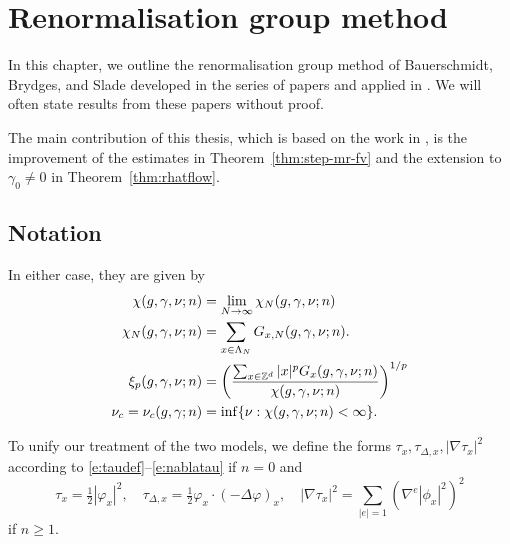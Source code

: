 \chapter{Renormalisation group method}
\label{sec:rg}

\renewcommand{\pm}{+}					%

In this chapter, we outline the renormalisation group method of Bauerschmidt,
Brydges, and Slade developed in the series of papers
\cite{BS-rg-norm,BS-rg-loc,BBS-rg-pt,BS-rg-IE,BS-rg-step} and
applied in \cite{BBS-phi4-log,BBS-saw4-log,BBS-saw4,ST-phi4}. We will often
state results from these papers without proof.

The main contribution of this
thesis, which is based on the work in \cite{BSTW-clp,BSW-saw-sa}, is the
improvement of the estimates in Theorem~\ref{thm:step-mr-fv} and the extension
to $\gamma_0 \ne 0$ in Theorem~\ref{thm:rhatflow}.


\section{Notation}


In either case, they are given by
\begin{align}
\label{e:chilim}
\chi(g, \gamma, \nu; n)
	&= \lim_{N\rightarrow\infty} \chi_N(g, \gamma, \nu; n) \\
\label{e:chiNdef}
\chi_N(g, \gamma, \nu; n)
	&= \sum_{x\in\Lambda_N} G_{x,N}(g, \gamma, \nu; n). \\
\label{e:clp}
\xi_p(g, \gamma, \nu; n)
	&= \left(\frac{\sum_{x\in{ {{\mathbb Z}}^d }} |x|^p G_x(g, \gamma, \nu; n)}{\chi(g, \gamma, \nu; n)}\right)^{1/p} \\
\label{e:nuc-def}
\nu_c
	= \nu_c(g, \gamma; n) &= \inf \{ \nu : \chi(g, \gamma, \nu; n) < \infty \}.
\end{align}


To unify our treatment of the two models,
we define the forms $\tau_x, \tau_{\Delta,x}, |\nabla\tau_x|^2$ according
to \eqref{e:taudef}--\eqref{e:nablatau} if $n = 0$ and
\begin{equation}
\label{e:tauphi}
\tau_x = \tfrac{1}{2} |\varphi_x|^2,
	\quad
\tau_{\Delta,x} = \tfrac{1}{2} \varphi_x \cdot (-\Delta \varphi)_x,
	\quad
|\nabla\tau_x|^2 = \sum_{|e|=1} (\nabla^e |\phi_x|^2)^2
\end{equation}
if $n \ge 1$.

